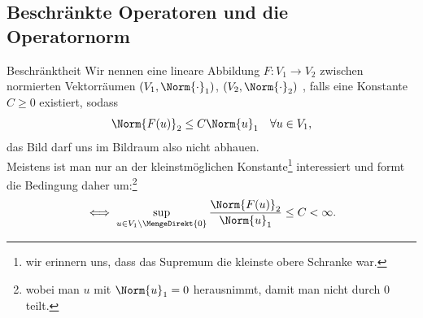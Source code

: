\subsection{Beschränkte Operatoren und die Operatornorm}
\begin{Def}
{Beschränktheit}
Wir nennen eine lineare Abbildung $F:V_1\to V_2$ zwischen normierten Vektorräumen $(V_1,\Norm{\cdot}_1)$, $(V_2,\Norm{\cdot}_2)$ , falls eine Konstante $C\geq 0$ existiert, sodass
\begin{equation}
    \Norm{F(u)}_2\leq C\Norm{u}_1\quad\forall u\in V_1,
\end{equation}
das Bild darf uns im Bildraum also nicht abhauen.\\
Meistens ist man nur an der kleinstmöglichen Konstante\footnote{wir erinnern uns, dass das Supremum die kleinste obere Schranke war.} interessiert und formt die Bedingung daher um:\footnote{wobei man $u$ mit $\Norm{u}_1=0$ herausnimmt, damit man nicht durch 0 teilt.}
\begin{equation}
    \iff \sup_{u\in V_1\setminus\MengeDirekt{0}}\frac{\Norm{F(u)}_2}{\Norm{u}_1}\leq C<\infty.
\end{equation}
\end{Def}

